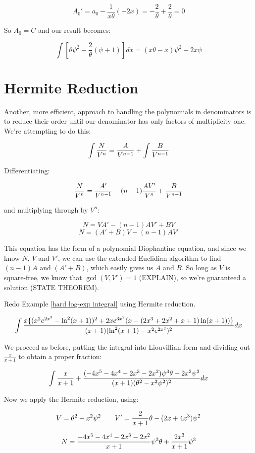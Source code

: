 $$A_0' = a_0 - \frac{1}{x \theta}(-2x) = -\frac{2}{\theta} + \frac{2}{\theta} = 0$$

So $A_0 = C$ and our result becomes:

$$\int \left[ \theta \psi^2 - \frac{2}{\theta}(\psi+1) \right] dx = (x\theta -x)\psi^2 - 2x \psi$$


\endexample

\vfill\eject

\section{Hermite Reduction}

Another, more efficient, approach to handling the polynomials in
denominators is to reduce their order until our denominator has only
factors of multiplicity one.  We're attempting to do this:

$$\int {N\over{V^n}} = {A\over{V^{n-1}}} + \int {B\over{V^{n-1}}}$$

Differentiating:

$${N\over{V^n}} = {A'\over{V^{n-1}}} - (n-1){AV'\over{V^n}} + {B\over{V^{n-1}}}$$

and multiplying through by $V^n$:

$$N = VA' - (n-1)AV' + BV$$
$$N = (A'+B)V - (n-1)AV'$$

This equation has the form of a polynomial Diophantine equation, and
since we know $N$, $V$ and $V'$, we can use the extended Euclidian
algorithm to find $(n-1)A$ and $(A'+B)$, which easily gives us $A$ and
$B$.  So long as $V$ is square-free, we know that $\gcd(V,V')=1$
(EXPLAIN), so we're guaranteed a solution (STATE THEOREM).

\example
Redo Example \ref{hard log-exp integral} using Hermite reduction.

$$\int{{x\{(x^2e^{2x^2}-\ln^2(x+1))^2+2xe^{3x^2}(x-(2x^3+2x^2+x+1)\ln(x+1))\}}\over{(x+1)(\ln^2(x+1) - x^2e^{2x^2})^2}} dx$$

We proceed as before, putting the integral into Liouvillian form
and dividing out $\frac{x}{x+1}$ to obtain a proper fraction:

$$\int {x\over{x+1}} + {{(-4x^5-4x^4-2x^3-2x^2)\psi^3\theta + {2x^3}\psi^3}\over{(x+1)(\theta^2 - x^2\psi^2)^2}} dx$$

Now we apply the Hermite reduction, using:

$$V = \theta^2 - x^2\psi^2 \qquad V' = {2\over{x+1}}\theta - (2x+4x^3)\psi^2$$

$$N = {{{-4x^5-4x^4-2x^3-2x^2}\over{x+1}}\psi^3\theta + {{2x^3}\over{x+1}}\psi^3} $$

